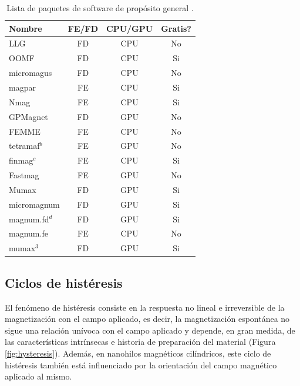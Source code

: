 \newpage
\begin{table}[htp!]
    \centering
    \begin{tabular}{|l|c|c|c|}
        \hline
        \textbf{Nombre} & \textbf{FE/FD} & \textbf{CPU/GPU} & \textbf{Gratis?} \\ \hline
        LLG & FD & CPU & No \\ \hline
        OOMF & FD & CPU & Si \\ \hline
        micromagus & FD & CPU & No \\ \hline
        magpar & FE & CPU & Si \\ \hline
        Nmag & FE & CPU & Si \\ \hline
        GPMagnet & FD & GPU & No \\ \hline
        FEMME & FE & CPU & No \\ \hline
        tetramaf$^b$ & FE & GPU & No \\ \hline 
        finmag$^c$ & FE & CPU & Si \\ \hline
        Fastmag & FE & GPU & No \\ \hline
        Mumax & FD & GPU & Si \\ \hline
        micromagnum & FD & GPU & Si \\ \hline
        magnum.fd$^d$ & FD & GPU & Si \\ \hline
        magnum.fe & FE & CPU & No \\ \hline
        mumax$^3$ & FD & GPU & Si \\ \hline
    \end{tabular}
    \renewcommand{\tablename}{\textbf{Tabla}}
    \renewcommand\thetable{\textbf{\arabic{table}}}
    \caption{Lista de paquetes de software de propósito general \cite{Tomorrow}.}
    \label{tab:SoftwarePackage}
\end{table}

\subsection{Ciclos de histéresis}
El fenómeno de histéresis consiste en la respuesta no lineal e irreversible de la magnetización con el campo aplicado, es decir, la magnetización espontánea no sigue una relación unívoca con el campo aplicado y depende, en gran medida, de las características intrínsecas e historia de preparación del material (Figura \ref{fig:hysteresis})\cite{coey_2010,jackson2012classical}. Además, en nanohilos magnéticos cilíndricos, este ciclo de histéresis también está influenciado por la orientación del campo magnético aplicado al mismo\cite{CylindricalMagneticNonowires}.

